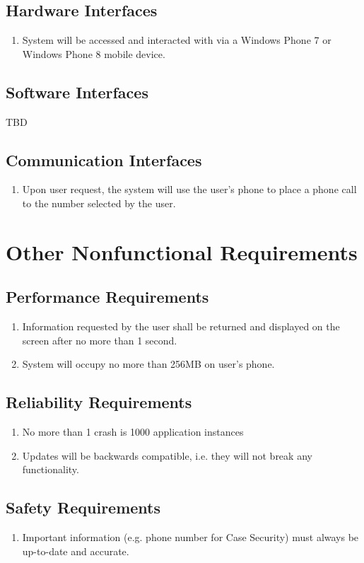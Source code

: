 \documentclass[pdftex,12pt,letter]{article}
\begin{document}
\subsection{Hardware Interfaces}
\begin{enumerate}[HI-1:]
\item System will be accessed and interacted with via a Windows Phone 7 or Windows Phone 8 mobile device.
\end{enumerate}
\subsection{Software Interfaces}
TBD
\subsection{Communication Interfaces}
\begin{enumerate}[CI-1]
\item Upon user request, the system will use the user's phone to place a phone call to the number selected by the user.
\end{enumerate}
\section{Other Nonfunctional Requirements}
\subsection{Performance Requirements}
\begin{enumerate}[PR-1:]
\item Information requested by the user shall be returned and displayed on the screen after no more than 1 second.
\item System will occupy no more than 256MB on user's phone.
\end{enumerate}
\subsection{Reliability Requirements}
\begin{enumerate}[RR-1:]
\item No more than 1 crash is 1000 application instances
\item Updates will be backwards compatible, i.e. they will not break any functionality.
\end{enumerate}
\subsection{Safety Requirements}
\begin{enumerate}[SR-1:]
\item Important information (e.g. phone number for Case Security) must always be up-to-date and accurate.
\end{enumerate}
\end{document}
